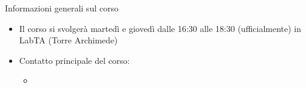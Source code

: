 \begin{frame}{Informazioni generali sul corso}
	\begin{itemize}
		\item Il corso si svolgerà martedì e giovedì dalle 16:30 alle 18:30 (ufficialmente) in LabTA (Torre
		Archimede)
		\vfill
		\item Contatto principale del corso:
		\begin{itemize}
			\item {}
		\end{itemize}
	\end{itemize}
\end{frame}